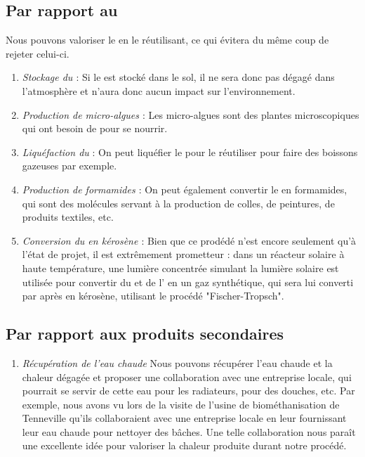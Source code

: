 \documentclass[10pt, a4paper, oneside]{scrartcl}
\begin{document}
\subsection{Par rapport au \texorpdfstring{}{CO \texttwoinferior}}
Nous pouvons valoriser le  en le réutilisant, ce qui évitera du même coup de rejeter celui-ci.
\begin{enumerate}
\item \emph{Stockage du   \cite{capt} \cite{capt2}} : Si le  est stocké dans le sol, il ne sera donc pas dégagé dans l'atmosphère et n'aura donc aucun impact sur l'environnement. 
\item \emph{Production de micro-algues \cite{algues}} : Les micro-algues sont des plantes microscopiques qui ont besoin de  pour se nourrir. 
\item \emph{Liquéfaction du } : On peut liquéfier le  pour le réutiliser pour faire des boissons gazeuses par exemple. 
\item \emph{Production de formamides \cite{sol1} \cite{sol2}} : On peut également convertir le  en formamides, qui sont des molécules servant à la production de colles, de peintures, de produits textiles, etc.
\item \emph{Conversion du  en kérosène \cite{sol3} \cite{sol4}} : Bien que ce prodédé n'est encore seulement qu'à l'état de projet, il est extrêmement prometteur : dans un réacteur solaire à haute température, une lumière concentrée simulant la lumière solaire est utilisée pour convertir du  et de l' en un gaz synthétique, qui sera lui converti par après en kérosène, utilisant le procédé "Fischer-Tropsch".
\end{enumerate}
\subsection{Par rapport aux produits secondaires}
\begin{enumerate}
\item \emph{Récupération de l'eau chaude} Nous pouvons récupérer l'eau chaude et la chaleur dégagée et proposer une collaboration avec une entreprise locale, qui pourrait se servir de cette eau pour les radiateurs, pour des douches, etc. Par exemple, nous avons vu lors de la visite de l'usine de biométhanisation de Tenneville qu'ils collaboraient avec une entreprise locale en leur fournissant leur eau chaude pour nettoyer des bâches. Une telle collaboration nous paraît une excellente idée pour valoriser la chaleur produite durant notre procédé.
\end{enumerate}

\printbibliography[heading=bibintoc]
\end{document}
